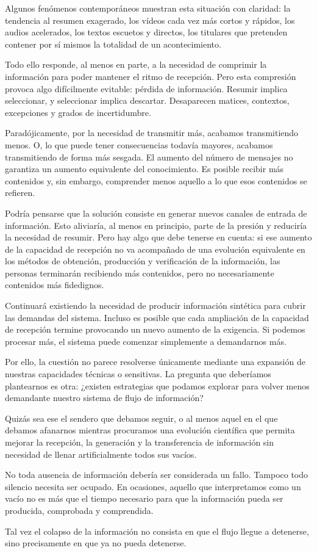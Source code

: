 \documentclass[11pt,a4paper]{article}
\begin{document}
Algunos fenómenos contemporáneos muestran esta situación con claridad: la tendencia al resumen exagerado, los vídeos cada vez más cortos y rápidos, los audios acelerados, los textos escuetos y directos, los titulares que pretenden contener por sí mismos la totalidad de un acontecimiento.

Todo ello responde, al menos en parte, a la necesidad de comprimir la información para poder mantener el ritmo de recepción. Pero esta compresión provoca algo difícilmente evitable: pérdida de información. Resumir implica seleccionar, y seleccionar implica descartar. Desaparecen matices, contextos, excepciones y grados de incertidumbre.

Paradójicamente, por la necesidad de transmitir más, acabamos transmitiendo menos. O, lo que puede tener consecuencias todavía mayores, acabamos transmitiendo de forma más sesgada. El aumento del número de mensajes no garantiza un aumento equivalente del conocimiento. Es posible recibir más contenidos y, sin embargo, comprender menos aquello a lo que esos contenidos se refieren.

Podría pensarse que la solución consiste en generar nuevos canales de entrada de información. Esto aliviaría, al menos en principio, parte de la presión y reduciría la necesidad de resumir. Pero hay algo que debe tenerse en cuenta: si ese aumento de la capacidad de recepción no va acompañado de una evolución equivalente en los métodos de obtención, producción y verificación de la información, las personas terminarán recibiendo más contenidos, pero no necesariamente contenidos más fidedignos.

Continuará existiendo la necesidad de producir información sintética para cubrir las demandas del sistema. Incluso es posible que cada ampliación de la capacidad de recepción termine provocando un nuevo aumento de la exigencia. Si podemos procesar más, el sistema puede comenzar simplemente a demandarnos más.

Por ello, la cuestión no parece resolverse únicamente mediante una expansión de nuestras capacidades técnicas o sensitivas. La pregunta que deberíamos plantearnos es otra: ¿existen estrategias que podamos explorar para volver menos demandante nuestro sistema de flujo de información?

Quizás sea ese el sendero que debamos seguir, o al menos aquel en el que debamos afanarnos mientras procuramos una evolución científica que permita mejorar la recepción, la generación y la transferencia de información sin necesidad de llenar artificialmente todos sus vacíos.

No toda ausencia de información debería ser considerada un fallo. Tampoco todo silencio necesita ser ocupado. En ocasiones, aquello que interpretamos como un vacío no es más que el tiempo necesario para que la información pueda ser producida, comprobada y comprendida.

Tal vez el colapso de la información no consista en que el flujo llegue a detenerse, sino precisamente en que ya no pueda detenerse.
\end{document}

